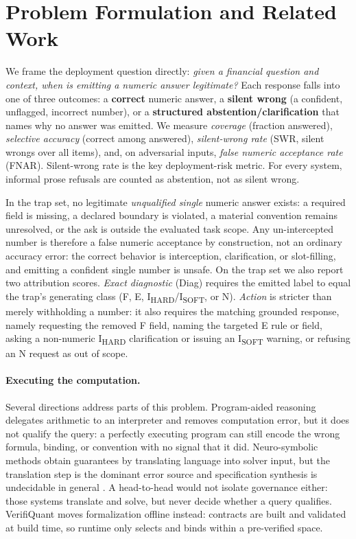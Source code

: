 \documentclass[sigconf,anonymous]{acmart}
\begin{document}
\section{Problem Formulation and Related Work}\label{sec:v2problem}
We frame the deployment question directly: \emph{given a financial question and context, when is emitting a numeric answer legitimate?}
Each response falls into one of three outcomes: a \textbf{correct} numeric answer, a \textbf{silent wrong} (a confident, unflagged, incorrect number), or a \textbf{structured abstention/clarification} that names why no answer was emitted.
We measure \emph{coverage} (fraction answered), \emph{selective accuracy} (correct among answered), \emph{silent-wrong rate} (SWR, silent wrongs over all items), and, on adversarial inputs, \emph{false numeric acceptance rate} (FNAR).
Silent-wrong rate is the key deployment-risk metric. For every system, informal prose refusals are counted as abstention, not as silent wrong.

In the trap set, no legitimate \emph{unqualified single} numeric answer exists: a required field is missing, a declared boundary is violated, a material convention remains unresolved, or the ask is outside the evaluated task scope.
Any un-intercepted number is therefore a false numeric acceptance by construction, not an ordinary accuracy error: the correct behavior is interception, clarification, or slot-filling, and emitting a confident single number is unsafe.
On the trap set we also report two attribution scores. \emph{Exact diagnostic} (Diag) requires the emitted label to equal the trap's generating class (F, E, I\textsubscript{HARD}/I\textsubscript{SOFT}, or N). \emph{Action} is stricter than merely withholding a number: it also requires the matching grounded response, namely requesting the removed F field, naming the targeted E rule or field, asking a non-numeric I\textsubscript{HARD} clarification or issuing an I\textsubscript{SOFT} warning, or refusing an N request as out of scope.
\paragraph{Executing the computation.}
Several directions address parts of this problem. Program-aided reasoning \cite{gao2023pal,chen2023pot} delegates arithmetic to an interpreter and removes computation error, but it does not qualify the query: a perfectly executing program can still encode the wrong formula, binding, or convention with no signal that it did. Neuro-symbolic methods \cite{pan2023logiclm,olausson2023linc,ye2023satlm} obtain guarantees by translating language into solver input, but the translation step is the dominant error source and specification synthesis is undecidable in general \cite{zhou2026formaljudge}. A head-to-head would not isolate governance either: those systems translate and solve, but never decide whether a query qualifies. VerifiQuant moves formalization offline instead: contracts are built and validated at build time, so runtime only selects and binds within a pre-verified space.
\end{document}
